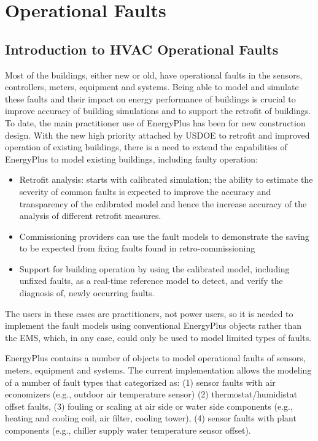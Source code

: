 \chapter{Operational Faults}\label{operational-faults}

\section{Introduction to HVAC Operational Faults}\label{introduction-to-hvac-operational-faults}

Most of the buildings, either new or old, have operational faults in the sensors, controllers, meters, equipment and systems. Being able to model and simulate these faults and their impact on energy performance of buildings is crucial to improve accuracy of building simulations and to support the retrofit of buildings. To date, the main practitioner use of EnergyPlus has been for new construction design. With the new high priority attached by USDOE to retrofit and improved operation of existing buildings, there is a need to extend the capabilities of EnergyPlus to model existing buildings, including faulty operation:

\begin{itemize}
\tightlist
\item
  Retrofit analysis: starts with calibrated simulation; the ability to estimate the severity of common faults is expected to improve the accuracy and transparency of the calibrated model and hence the increase accuracy of the analysis of different retrofit measures.\\
\item
  Commissioning providers can use the fault models to demonstrate the saving to be expected from fixing faults found in retro-commissioning
\item
  Support for building operation by using the calibrated model, including unfixed faults, as a real-time reference model to detect, and verify the diagnosis of, newly occurring faults.
\end{itemize}

The users in these cases are practitioners, not power users, so it is needed to implement the fault models using conventional EnergyPlus objects rather than the EMS, which, in any case, could only be used to model limited types of faults.

EnergyPlus contains a number of objects to model operational faults of sensors, meters, equipment and systems. The current implementation allows the modeling of a number of fault types that categorized as: (1) sensor faults with air economizers (e.g., outdoor air temperature sensor) (2) thermostat/humidistat offset faults, (3) fouling or scaling at air side or water side components (e.g., heating and cooling coil, air filter, cooling tower), (4) sensor faults with plant components (e.g., chiller supply water temperature sensor offset).


